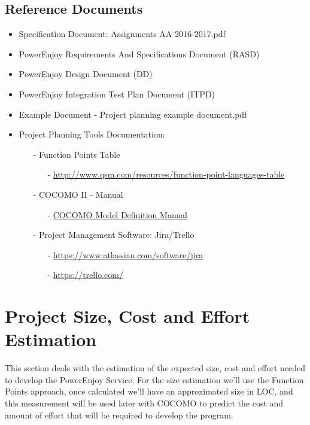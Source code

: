 \documentclass[a4paper]{article}
\begin{document}
\subsection{Reference Documents}
\begin{itemize}
\item Specification Document: Assignments AA 2016-2017.pdf
\item PowerEnjoy Requirements And Specifications Document (RASD)
\item PowerEnjoy Design Document (DD)
\item PowerEnjoy Integration Test Plan Document (ITPD)
\item Example Document - Project planning example document.pdf
\item Project Planning Tools Documentation:
\begin{itemize}
\item[-] Function Points Table
\begin{itemize}
	\item[-]\url{http://www.qsm.com/resources/function-point-languages-table}
\end{itemize}
\item[-] COCOMO II - Manual
\begin{itemize}
	\item[-]\href{http://csse.usc.edu/csse/research/COCOMOII/cocomo2000.0/CII_modelman2000.0.pdf}{COCOMO Model Definition Manual}
\end{itemize}
\item[-] Project Management Software: Jira/Trello
\begin{itemize}
	\item[-]\url{https://www.atlassian.com/software/jira}
	\item[-]\url{https://trello.com/}
\end{itemize}
\end{itemize}
\end{itemize}

\newpage
\section{Project Size, Cost and Effort Estimation}
This section deals with the estimation of the expected size, cost and effort needed to develop the PowerEnjoy Service.
For the size estimation we'll use the Function Points approach, once calculated we'll have an approximated size in LOC, and this measurement will be used later with COCOMO to predict the cost and amount of effort that will be required to develop the program.
\end{document}
